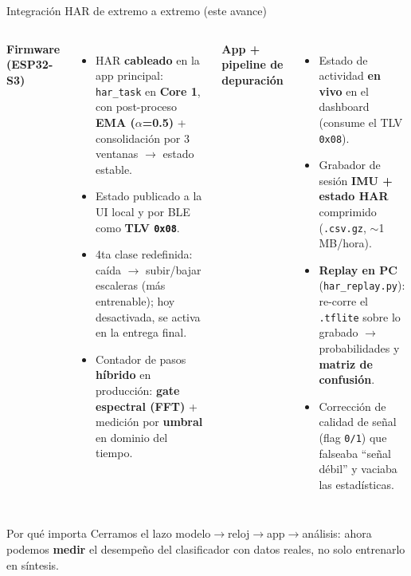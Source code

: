 \documentclass[aspectratio=169, 10pt]{beamer}
\begin{document}
\begin{frame}{Integraci\'on HAR de extremo a extremo (este avance)}
    \begin{columns}[T]
        \footnotesize
        \textbf{\textcolor{main}{Firmware (ESP32-S3)}}
        \begin{itemize}\itemsep0.10cm
            \item HAR \textbf{cableado} en la app principal: \texttt{har\_task} en \textbf{Core 1}, con post-proceso \textbf{EMA ($\alpha$=0.5)} + consolidaci\'on por 3 ventanas $\rightarrow$ estado estable.
            \item Estado publicado a la UI local y por BLE como \textbf{TLV \texttt{0x08}}.
            \item 4ta clase redefinida: \alert{ca\'ida $\rightarrow$ subir/bajar escaleras} (m\'as entrenable); hoy desactivada, se activa en la entrega final.
            \item Contador de pasos \textbf{h\'ibrido} en producci\'on: \textbf{gate espectral (FFT)} + medici\'on por \textbf{umbral} en dominio del tiempo.
        \end{itemize}
        \footnotesize
        \textbf{\textcolor{main}{App + pipeline de depuraci\'on}}
        \begin{itemize}\itemsep0.10cm
            \item Estado de actividad \textbf{en vivo} en el dashboard (consume el TLV \texttt{0x08}).
            \item Grabador de sesi\'on \textbf{IMU + estado HAR} comprimido (\texttt{.csv.gz}, $\sim$1\,MB/hora).
            \item \textbf{Replay en PC} (\texttt{har\_replay.py}): re-corre el \texttt{.tflite} sobre lo grabado $\rightarrow$ probabilidades y \textbf{matriz de confusi\'on}.
            \item Correcci\'on de calidad de se\~nal (flag \texttt{0/1}) que falseaba ``se\~nal d\'ebil'' y vaciaba las estad\'isticas.
        \end{itemize}
    \end{columns}
    \vspace{0.20cm}
    \begin{block}{Por qu\'e importa}
        \scriptsize Cerramos el lazo modelo$\rightarrow$reloj$\rightarrow$app$\rightarrow$an\'alisis: ahora podemos \textbf{medir} el desempe\~no del clasificador con datos reales, no solo entrenarlo en s\'intesis.
    \end{block}
\end{frame}
\end{document}
